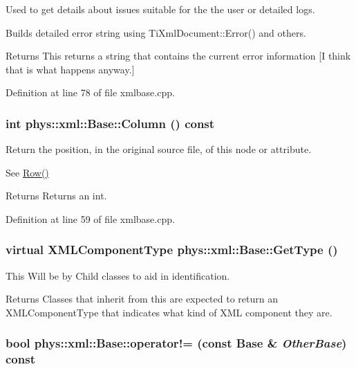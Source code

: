 Used to get details about issues suitable for the the user or detailed logs. 

Builds detailed error string using TiXmlDocument::Error() and others. \begin{DoxyReturn}{Returns}
This returns a string that contains the current error information \mbox{[}I think that is what happens anyway.\mbox{]} 
\end{DoxyReturn}


Definition at line 78 of file xmlbase.cpp.

\hypertarget{classphys_1_1xml_1_1Base_a7ef4a2c8165c6bb63f75fdc9f2231948}{
\subsubsection[{Column}]{\setlength{\rightskip}{0pt plus 5cm}int phys::xml::Base::Column () const}}
\label{df/d10/classphys_1_1xml_1_1Base_a7ef4a2c8165c6bb63f75fdc9f2231948}


Return the position, in the original source file, of this node or attribute. 

See \hyperlink{classphys_1_1xml_1_1Base_adc2f732f1f37ef7bae5b701a84470754}{Row()} \begin{DoxyReturn}{Returns}
Returns an int. 
\end{DoxyReturn}


Definition at line 59 of file xmlbase.cpp.

\hypertarget{classphys_1_1xml_1_1Base_af2821c239b5eb31c2524a499bf3ff19f}{
\subsubsection[{GetType}]{\setlength{\rightskip}{0pt plus 5cm}virtual {\bf XMLComponentType} phys::xml::Base::GetType ()}}
\label{df/d10/classphys_1_1xml_1_1Base_af2821c239b5eb31c2524a499bf3ff19f}


This Will be by Child classes to aid in identification. 

\begin{DoxyReturn}{Returns}
Classes that inherit from this are expected to return an XMLComponentType that indicates what kind of XML component they are. 
\end{DoxyReturn}
\hypertarget{classphys_1_1xml_1_1Base_a45216237a77d457ceda41f40583f80ac}{
\subsubsection[{operator!=}]{\setlength{\rightskip}{0pt plus 5cm}bool phys::xml::Base::operator!= (const {\bf Base} \& {\em OtherBase}) const}}
\label{df/d10/classphys_1_1xml_1_1Base_a45216237a77d457ceda41f40583f80ac}


